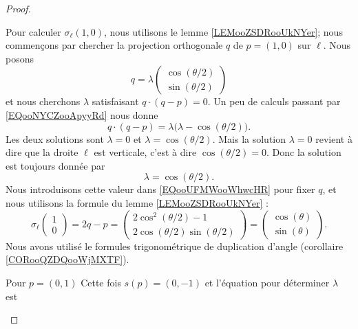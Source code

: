 \begin{proof}
\begin{subproof}
    Pour calculer \( \sigma_{\ell}(1,0)\), nous utilisons le lemme \ref{LEMooZSDRooUkNYer}; nous commençons par chercher la projection orthogonale \( q\) de \( p=(1,0)\) sur \( \ell\). Nous posons
    \begin{equation}        \label{EQooUFMWooWhwcHR}
            q=\lambda\begin{pmatrix}
                \cos(\theta/2)    \\ 
                \sin(\theta/2)    
            \end{pmatrix}
        \end{equation}
        et nous cherchons \( \lambda\) satisfaisant \( q\cdot(q-p)=0\). Un peu de calculs passant par \eqref{EQooNYCZooApyyRd} nous donne
        \begin{equation}
            q\cdot (q-p)=\lambda\big( \lambda-\cos(\theta/2) \big).
        \end{equation}
        Les deux solutions sont \( \lambda=0\) et \( \lambda=\cos(\theta/2)\). Mais la solution \( \lambda=0\) revient à dire que la droite \( \ell\) est verticale, c'est à dire \( \cos(\theta/2)=0\). Donc la solution est toujours donnée par
        \begin{equation}
            \lambda=\cos(\theta/2).
        \end{equation}
        Nous introduisons cette valeur dans \eqref{EQooUFMWooWhwcHR} pour fixer \( q\), et nous utilisons la formule du lemme \ref{LEMooZSDRooUkNYer} :
        \begin{equation}
            \sigma_{\ell}\begin{pmatrix}
                1    \\ 
                0    
            \end{pmatrix}=2q-p=\begin{pmatrix}
                2\cos^2(\theta/2)-1    \\ 
                2\cos(\theta/2)\sin(\theta/2)    
            \end{pmatrix}
            =\begin{pmatrix}
                \cos(\theta)    \\ 
                \sin(\theta)    
            \end{pmatrix}.
        \end{equation}
        Nous avons utilisé le formules trigonométrique de duplication d'angle (corollaire \ref{CORooQZDQooWjMXTF}).
    \item[Pour \( p=(0,1)\)]
        Cette fois \( s(p)=(0,-1)\) et l'équation pour déterminer \( \lambda\) est

\end{subproof}
\end{proof}
